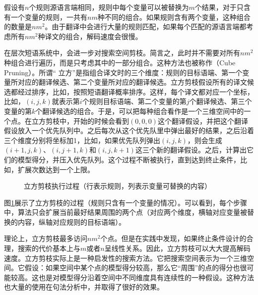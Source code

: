 \parinterval 假设有$n$个规则源语言端相同，规则中每个变量可以被替换为$m$个结果，对于只含有一个变量的规则，一共有$nm$种不同的组合。如果规则含有两个变量，这种组合的数量是$n{m}^2$。由于翻译中会进行大量的规则匹配，如果每个匹配的源语言端都考虑所有$n{m}^2$种译文的组合，解码速度会很慢。

\parinterval 在层次短语系统中，会进一步对搜索空间剪枝。简言之，此时并不需要对所有$n{m}^2$种组合进行遍历，而是只考虑其中的一部分组合。这种方法也被称作{\small{}}（Cube Pruning）。所谓`` 立方''是指组合译文时的三个维度：规则的目标语端、第一个变量所对应的翻译候选、第二个变量所对应的翻译候选。立方剪枝假设所有的译文候选都经过排序，比如，按照短语翻译概率排序。这样，每个译文都对应一个坐标，比如，$(i,j,k)$就表示第$i$个规则目标语端、第二个变量的第$j$个翻译候选、第三个变量的第$k$个翻译候选的组合。于是，可以把每种组合看作是一个三维空间中的一个点。在立方剪枝中，开始的时候会看到$(0,0,0)$这个翻译假设，并把这个翻译假设放入一个优先队列中。之后每次从这个优先队里中弹出最好的结果，之后沿着三个维度分别将坐标加1，比如，如果优先队列弹出$(i,j,k)$，则会生成$(i+1,j,k)$、$(i,j+1,k)$和$(i,j,k+1)$这三个新的翻译假设。之后，计算出它们的模型得分，并压入优先队列。这个过程不断被执行，直到达到终止条件，比如，扩展次数达到一个上限。

\begin{figure}[htp]
\centering

\caption{立方剪枝执行过程（行表示规则，列表示变量可替换的内容）}
\label{fig:4-40}
\end{figure}

\parinterval 图\ref{fig:4-40}展示了立方剪枝的过程（规则只含有一个变量的情况）。可以看到，每个步骤中，算法只会扩展当前最好结果周围的两个点（对应两个维度，横轴对应变量被替换的内容，纵轴对应规则的目标语端）。

\parinterval 理论上，立方剪枝最多访问$n{m}^2$个点。但是在实践中发现，如果终止条件设计的合理，搜索的代价基本上与$m$或者$n$呈线性关系。因此，立方剪枝可以大大提高解码速度。立方剪枝实际上是一种启发性的搜索方法。它把搜索空间表示为一个三维空间。它假设：如果空间中某个点的模型得分较高，那么它``周围''的点的得分也很可能较高。这也是对模型得分沿着空间中不同维度具有连续性的一种假设。这种方法也大量的使用在句法分析中，并取得了很好的效果。\\


